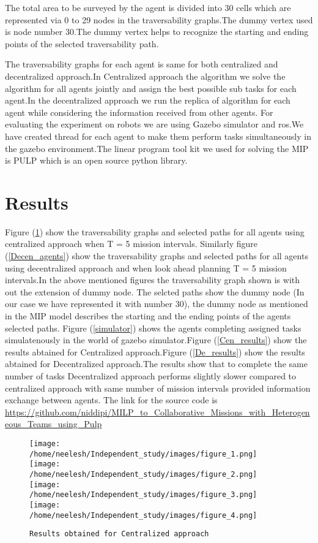 \documentclass[conference]{IEEEtran}
\begin{document}
{The total area to be surveyed by the agent is divided into 30 cells which are represented via 0 to 29 nodes in the traversability graphs.The dummy vertex used is node number 30.The dummy vertex helps to recognize the starting and ending points of the selected traversability path.

The traversability graphs for each agent is same for both centralized and decentralized approach.In Centralized approach the algorithm we solve the algorithm for all agents jointly and assign the best possible sub tasks for each agent.In the decentralized approach we run the replica of algorithm for each agent while considering the information received from other agents.
For evaluating the experiment on robots we are using Gazebo simulator and ros.We have created thread for each agent to make  them perform tasks simultaneously in the gazebo environment.The linear program tool kit we used for solving the MIP is PULP which is an open source python library. 
\section{Results}

Figure (\ref{Cen_agents}) show the traversability graphs and selected paths for all agents using centralized approach when T = 5 mission intervals. Similarly figure (\ref{Decen_agents}) show the traversability graphs and selected paths for all agents using decentralized approach and when look ahead planning T = 5 mission intervals.In the above mentioned figures the traversability graph shown is with out the extension of dummy node. The selcted paths show the dummy node (In our case we have represented it with number 30), the dummy node as mentioned in the MIP model describes the starting and the ending points of the agents selected paths. Figure (\ref{simulator}) shows the agents completing assigned tasks simulatenously in the world of gazebo simulator.Figure (\ref{Cen_results}) show the results abtained for Centralized approach.Figure (\ref{De_results}) show the results abtained for Decentralized approach.The results show that to complete the same number of tasks Decentralized approach performs slightly slower compared to centralized approach with same number of mission intervals provided information exchange between agents.
The link for the source code is \url{https://github.com/niddipi/MILP_to_Collaborative_Missions_with_Heterogeneous_Teams_using_Pulp}
\begin{figure}
\hfill\begin{minipage}{0.5\textwidth}\centering
\texttt{[image: /home/neelesh/Independent\_study/images/figure\_1.png]}
\texttt{[image: /home/neelesh/Independent\_study/images/figure\_2.png]}
\texttt{[image: /home/neelesh/Independent\_study/images/figure\_3.png]}
\texttt{[image: /home/neelesh/Independent\_study/images/figure\_4.png]}
\caption{\texttt{Results obtained for Centralized approach}}\label{Cen_agents}
\end{minipage}
\end{figure}

}
\end{document}
